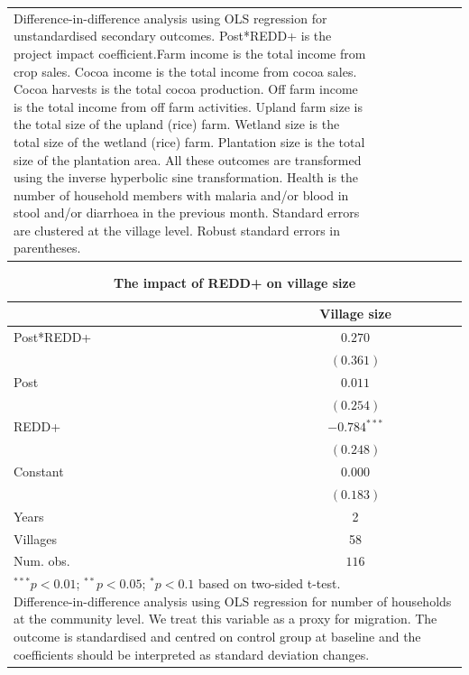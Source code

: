 \documentclass[
]{article}
\begin{document}
\begin{landscape}
\begin{table}[h]
\begin{center}
\begin{tabular}{l c c c c c c c}
{{{       Difference-in-difference analysis using OLS regression for unstandardised secondary outcomes. Post*REDD+ is the project impact coefficient.Farm income is the total income from crop sales. Cocoa income is the total income from cocoa sales. Cocoa harvests is the total cocoa production. Off farm income is the total income from off farm activities. Upland farm size is the total size of the upland (rice) farm. Wetland size is the total size of the wetland (rice) farm. Plantation size is the total size of the plantation area. All these outcomes are transformed using the inverse hyperbolic sine transformation. Health is the number of household members with malaria and/or blood in stool and/or diarrhoea in the previous month. Standard errors are clustered at the village level. Robust standard errors in parentheses.}}}
\end{tabular}
\label{table:coefficients}
\end{center}
\end{table}
\end{landscape}

\begin{table}[h]
\caption{\textbf{The impact of REDD+ on village size}}
\begin{center}
\begin{tabular}{l c}
\hline
 & Village size \\
\hline
Post*REDD+ & $0.270$        \\
           & $(0.361)$      \\
Post       & $0.011$        \\
           & $(0.254)$      \\
REDD+      & $-0.784^{***}$ \\
           & $(0.248)$      \\
Constant   & $0.000$        \\
           & $(0.183)$      \\
\hline
Years      & 2              \\
Villages   & 58             \\
Num. obs.  & $116$          \\
\hline
\multicolumn{2}{l}{\scriptsize{\parbox{.5\linewidth}{\vspace{2pt}$^{***}p<0.01$; $^{**}p<0.05$; $^{*}p<0.1$ based on two-sided t-test.\\
       Difference-in-difference analysis using OLS regression for number of households at the community level. We treat this variable as a proxy for migration. The outcome is standardised and centred on control group at baseline and the coefficients should be interpreted as standard deviation changes.}}}
\end{tabular}
\label{table:coefficients}
\end{center}
\end{table}
\end{document}
